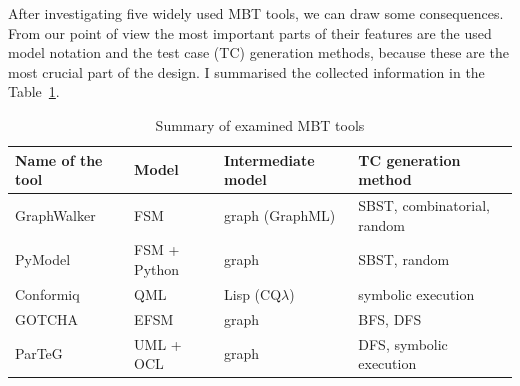 After investigating five widely used MBT tools, we can draw some consequences. From our point of view the most important parts of their features are the used model notation and the test case (TC) generation methods, because these are the most crucial part of the design. I summarised the collected information in the Table~\ref{tab:toolssummary}.

\begin{table}[htb]
\begin{center}
\begin{tabular}{llll}\toprule
	\textbf{Name of the tool} & \textbf{Model} & \textbf{Intermediate model} & \textbf{TC generation method}\\\midrule
	GraphWalker & FSM & graph (GraphML) & SBST, combinatorial, random\\
	PyModel & FSM + Python & graph & SBST, random\\
	Conformiq & QML & Lisp (CQ$\lambda$) & symbolic execution\\
	GOTCHA & EFSM & graph & BFS, DFS\\
	ParTeG & UML + OCL & graph & DFS, symbolic execution\\
\bottomrule
\end{tabular}
\end{center}
\caption{\label{tab:toolssummary} Summary of examined MBT tools}
\end{table}

